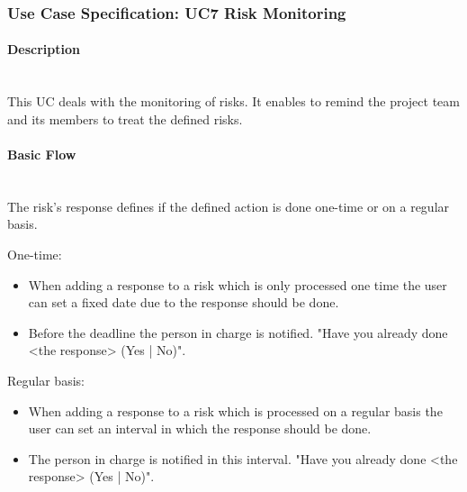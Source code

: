 
\newpage
\subsubsection{Use Case Specification: \ac{UC}7 Risk Monitoring}
\label{sec:domainBbh}

\paragraph*{Description}\mbox{}\\
This \ac{UC} deals with the monitoring of risks. It enables to remind the project team and its members to treat the defined risks.


\paragraph*{Basic Flow} \mbox{}\\
\noindent
The risk's response defines if the defined action is done one-time or on a regular basis. 

\noindent
One-time:
\begin{itemize}
	\vspace{-3mm}
	\setlength\itemsep{-1em}
	
	\item When adding a response to a risk which is only processed one time the user can set a fixed date due to the response should be done.
	\item Before the deadline the person in charge is notified. "Have you already done <the response> (Yes | No)".
\end{itemize}

\noindent
Regular basis:
\begin{itemize}
	\vspace{-3mm}
	\setlength\itemsep{-1em}
	
	\item When adding a response to a risk which is processed on a regular basis the user can set an interval in which the response should be done.
	\item The person in charge is notified in this interval. "Have you already done <the response> (Yes | No)".
\end{itemize}

